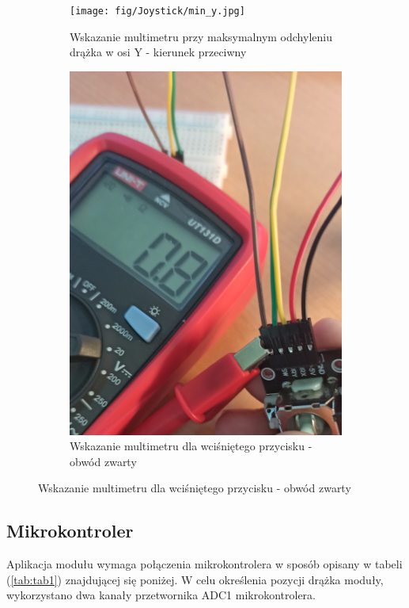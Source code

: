 \documentclass[11pt, a4paper]{article}
\begin{document}
\vspace{0.25cm}
\begin{figure}[h]
\centering
\begin{subfigure}{.5\textwidth}
\centering
\texttt{[image: fig/Joystick/min\_y.jpg]}
\caption{\centering Wskazanie multimetru przy maksymalnym odchyleniu drążka w osi Y - kierunek przeciwny}
\label{fig:_uklad_woltomierz_otw}
\end{subfigure}%
\begin{subfigure}{.5\textwidth}
\centering
\includegraphics[width=.6\linewidth]{sw.jpg}
\caption{\centering Wskazanie multimetru dla wciśniętego przycisku - obwód zwarty}
\label{fig:_uklad_woltomierz_zmk}
\end{subfigure}
\label{fig:woltomierz}
\end{figure}
\vspace{0.25cm}
\vspace{0.5cm}
\newpage
\subsection{Mikrokontroler}
Aplikacja modułu wymaga połączenia mikrokontrolera w sposób opisany w tabeli (\ref{tab:tab1}) znajdującej się poniżej. W celu określenia pozycji drążka moduły, wykorzystano dwa kanały przetwornika ADC1 mikrokontrolera.
\end{document}
